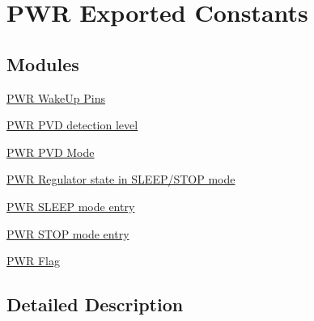 \hypertarget{group___p_w_r___exported___constants}{}\section{P\+WR Exported Constants}
\label{group___p_w_r___exported___constants}
\subsection*{Modules}
\begin{DoxyCompactItemize}
\item 
\hyperlink{group___p_w_r___wake_up___pins}{P\+W\+R Wake\+Up Pins}
\item 
\hyperlink{group___p_w_r___p_v_d__detection__level}{P\+W\+R P\+V\+D detection level}
\item 
\hyperlink{group___p_w_r___p_v_d___mode}{P\+W\+R P\+V\+D Mode}
\item 
\hyperlink{group___p_w_r___regulator__state__in___s_t_o_p__mode}{P\+W\+R Regulator state in S\+L\+E\+E\+P/\+S\+T\+O\+P mode}
\item 
\hyperlink{group___p_w_r___s_l_e_e_p__mode__entry}{P\+W\+R S\+L\+E\+E\+P mode entry}
\item 
\hyperlink{group___p_w_r___s_t_o_p__mode__entry}{P\+W\+R S\+T\+O\+P mode entry}
\item 
\hyperlink{group___p_w_r___flag}{P\+W\+R Flag}
\end{DoxyCompactItemize}


\subsection{Detailed Description}
